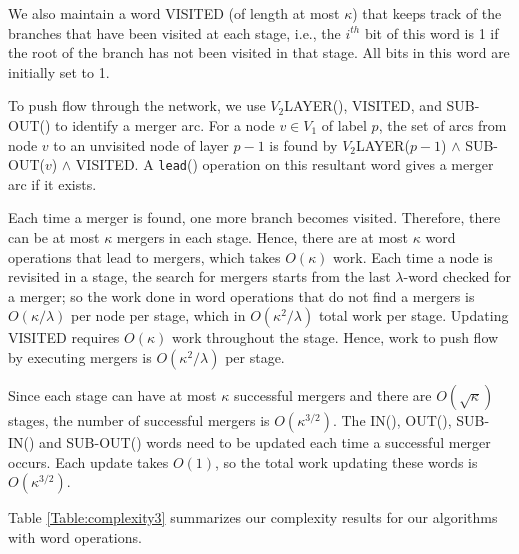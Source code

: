 \documentclass{article}
\begin{document}
We also maintain a word VISITED (of length at most $\kappa$) that keeps track of the branches that have been visited at each stage, i.e., the $i^{th}$ bit of this word is 1 if the root of the branch has {not} been visited in that stage. All bits in this word are initially set to 1.

To push flow through the network, we use $V_2$LAYER(), VISITED, and SUB-OUT() to identify a merger arc. For a node $v \in V_1$ of label $p$, the set of arcs from node $v$ to an unvisited node of layer $p-1$ is found by $V_2$LAYER($p-1$) $\wedge$ SUB-OUT($v$) $\wedge$ VISITED. A {\tt lead}() operation on this resultant word gives a merger arc if it exists.

Each time a merger is found, one more branch becomes visited. Therefore, there can be at most $\kappa$ mergers in each stage. Hence, there are at most $\kappa$ word operations that lead to mergers, which takes $O(\kappa)$ work. Each time a node is revisited in a stage, the search for mergers starts from the last $\lambda$-word checked for a merger; so the work done in word operations that do not find a mergers is $O(\kappa/\lambda)$ per node per stage, which in $O(\kappa^2/\lambda)$ total work per stage.  Updating VISITED requires $O(\kappa)$ work throughout the stage. Hence, work to push flow by executing mergers is $O(\kappa^2/\lambda)$ per stage.

Since each stage can have at most $\kappa$ successful mergers and there are $O(\sqrt{\kappa})$ stages, the number of successful mergers is $O(\kappa^{3/2})$. The IN(), OUT(), SUB-IN() and SUB-OUT() words need to be updated each time a successful merger occurs. Each update takes $O(1)$, so the total work updating these words is $O(\kappa^{3/2})$.

Table \ref{Table:complexity3} summarizes our complexity results for our algorithms with word operations.
\end{document}
